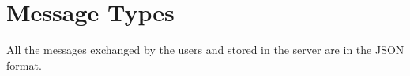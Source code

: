 \newpage
\section{Message Types}
All  the messages exchanged by the users and stored in the server are in the JSON format.

